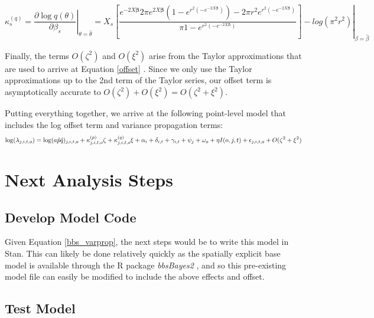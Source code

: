 \documentclass[12pt]{article}
\begin{document}

\begin{equation*}\label{kappa_q}
	\kappa_{s}^{(q)} = \left. \dfrac{\partial \log q(\theta)}{\partial \beta_s} \right\vert_{\theta = \hat{\theta}}= \left. X_s \left[\dfrac{{e^{-2X\boldsymbol{\beta}}} {2 \pi  e^{2X\boldsymbol{\beta}}} {\left(1 - e^{r^2 \left(-e^{-2X\boldsymbol{\beta}}\right)}\right)} - {2\pi r^2} {e^{r^2 \left(-e^{-2X\boldsymbol{\beta}}\right)}}}             {\pi {1-e^{r^2 \left(-e^{-2X\boldsymbol{\beta}}\right)}}}\right]  - log(\pi^2r^2) \right\vert_{\beta = \hat{\beta}}
\end{equation*}

Finally, the terms $O(\zeta^2)$ and $O(\xi^2)$ arise from the Taylor approximations that are used to arrive at Equation \ref{offset} \citep{bravington_variance_2021}. Since we only use the Taylor approximations up to the 2nd term of the Taylor series, our offset term is asymptotically accurate to $O(\zeta^2) + O(\xi^2) = O(\zeta^2 + \xi^2)$.

Putting everything together, we arrive at the following point-level model that includes the log offset term and variance propagation terms:
\begin{equation}\label{bbs_varprop}
	\log(\lambda_{j,i,t,o}) = \log(a \hat{p} \hat{q})_{j,i,t,o} + \kappa_{j,i,t,o}^{(p)}\zeta + \kappa_{j,i,t,o}^{(q)}\xi + \alpha_i + \delta_{i,t} + \gamma_{i,t} + \psi_j + \omega_o + \eta I(o,j,t) + \epsilon_{j,i,t,o} + O(\zeta^2 + \xi^2) \\
\end{equation}

\section{Next Analysis Steps}
\subsection{Develop Model Code}
Given Equation \ref{bbs_varprop}, the next steps would be to write this model in Stan. This can likely be done relatively quickly as the spatially explicit base model is available through the R package \textit{bbsBayes2} \citep{edwards_bbsbayes_2021}, and so this pre-existing model file can easily be modified to include the above effects and offset.

\subsection{Test Model}


	
\end{document}
